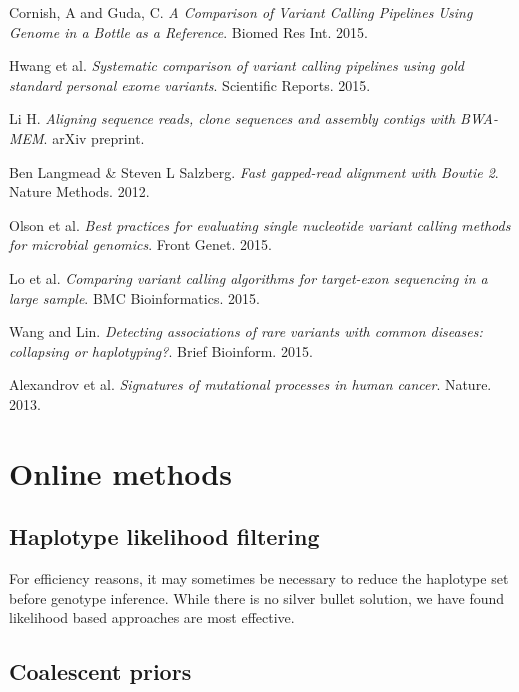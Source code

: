 \documentclass[notitlepage, twocolumn]{article}
\begin{document}
\begin{thebibliography}{9}
Cornish, A and Guda, C.
\textit{A Comparison of Variant Calling Pipelines Using Genome in a Bottle as a Reference}.
Biomed Res Int. 2015.

Hwang et al.
\textit{Systematic comparison of variant calling pipelines using gold standard personal exome variants}.
Scientific Reports. 2015.

Li H.
\textit{Aligning sequence reads, clone sequences and assembly contigs with BWA-MEM}.
arXiv preprint.

Ben Langmead \& Steven L Salzberg.
\textit{Fast gapped-read alignment with Bowtie 2}.
Nature Methods. 2012.

Olson et al.
\textit{Best practices for evaluating single nucleotide variant calling methods for microbial genomics}.
Front Genet. 2015.

Lo et al.
\textit{Comparing variant calling algorithms for target-exon sequencing in a large sample}.
BMC Bioinformatics. 2015.

Wang and Lin.
\textit{Detecting associations of rare variants with common diseases: collapsing or haplotyping?}.
Brief Bioinform. 2015.

Alexandrov et al.
\textit{Signatures of mutational processes in human cancer}.
Nature. 2013.

\end{thebibliography}

\section*{Online methods}

\subsection*{Haplotype likelihood filtering}

For efficiency reasons, it may sometimes be necessary to reduce the haplotype set before genotype inference. While there is no silver bullet solution, we have found likelihood based approaches are most effective.

\subsection*{Coalescent priors}
\end{document}
